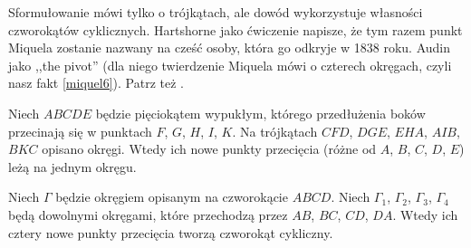 Sformułowanie mówi tylko o trójkątach, ale dowód wykorzystuje własności czworokątów cyklicznych.
Hartshorne jako ćwiczenie \cite[s. 61]{hartshorne2000} napisze, że tym razem punkt Miquela zostanie nazwany na cześć osoby, która go odkryje w 1838 roku.
%
Audin \cite[s. 104]{audin_2003} jako ,,the pivot'' (dla niego twierdzenie Miquela mówi o czterech okręgach, czyli nasz fakt \ref{miquel6}).
Patrz też \cite[s. 11]{komisarczyk_2024}.

\begin{proposition}
	Niech $ABCDE$ będzie pięciokątem wypukłym, którego przedłużenia boków przecinają się w punktach $F$, $G$, $H$, $I$, $K$.
	Na trójkątach $CFD$, $DGE$, $EHA$, $AIB$, $BKC$ opisano okręgi.
	Wtedy ich nowe punkty przecięcia (różne od $A$, $B$, $C$, $D$, $E$) leżą na jednym okręgu. 
\end{proposition}


\begin{proposition}
\label{miquel6}%
	Niech $\Gamma$ będzie okręgiem opisanym na czworokącie $ABCD$.
	Niech $\Gamma_1$, $\Gamma_2$, $\Gamma_3$, $\Gamma_4$ będą dowolnymi okręgami, które przechodzą przez $AB$, $BC$, $CD$, $DA$.
	Wtedy ich cztery nowe punkty przecięcia tworzą czworokąt cykliczny.
\end{proposition}

%